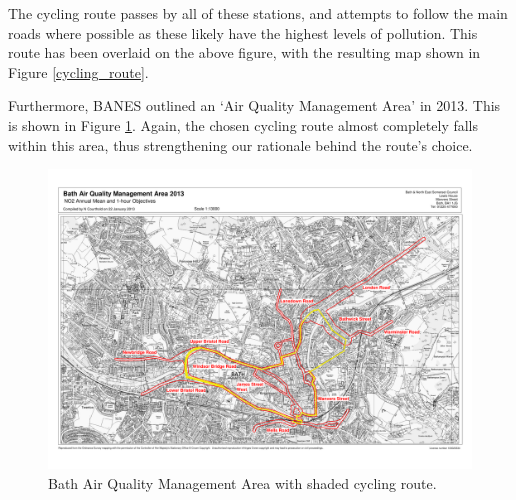 \documentclass[11pt]{report}
\begin{document}
The cycling route passes by all of these stations, and attempts to follow the main roads where possible as these likely have the highest levels of pollution. This route has been overlaid on the above figure, with the resulting map shown in Figure \ref{cycling_route}.

Furthermore, BANES outlined an `Air Quality Management Area' in 2013. This is shown in Figure \ref{aqma}. Again, the chosen cycling route almost completely falls within this area, thus strengthening our rationale behind the route's choice.

\begin{figure}[!tb]
\centering
\includegraphics[width=1\textwidth]{shaded_route}
\caption[Bath Air Quality Management Area.]{Bath Air Quality Management Area \citep{BANES2017baqap} with shaded cycling route.}
\label{aqma}
\end{figure}





\end{document}
